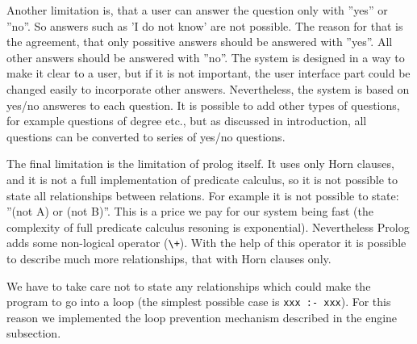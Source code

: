 \documentclass[a4paper]{article}
\begin{document}
Another limitation is, that a user can answer the question only with ''yes'' or ''no''. So answers such as 'I do not know' are not possible. The reason for that is the agreement, that only possitive answers should be answered with ''yes''. All other answers should be answered with ''no''. The system is designed in a way to make it clear to a user, but if it is not important, the user interface part could be changed easily to incorporate other answers. Nevertheless, the system is based on yes/no answeres to each question. It is possible to add other types of questions, for example questions of degree etc., but as discussed in introduction, all questions can be converted to series of yes/no questions.

The final limitation is the limitation of prolog itself. It uses only Horn clauses, and it is not a full implementation of predicate calculus, so it is not possible to state all relationships between relations. For example it is not possible to state: ''(not A) or (not B)''. This is a price we pay for our system being fast (the complexity of full predicate calculus resoning is exponential). Nevertheless Prolog adds some non-logical operator (\verb|\+|). With the help of this operator it is possible to describe much more relationships, that with Horn clauses only. 

We have to take care not to state any relationships which could make the program to go into a loop (the simplest possible case is \verb|xxx :- xxx|). For this reason we implemented the loop prevention mechanism described in the engine subsection.
\end{document}
